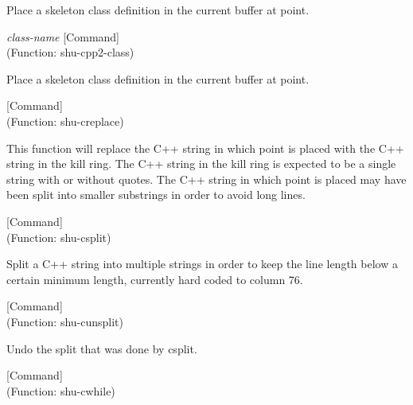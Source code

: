 \begin{doc-string}
Place a skeleton class definition in the current buffer at point.
\end{doc-string}

\vspace{1em}
\noindent
{}
\usebox{\funcname}\emph{class-name}
 \hfill [Command]\\%
 (Function: shu-cpp2-class)

\begin{doc-string}
Place a skeleton class definition in the current buffer at point.
\end{doc-string}

\vspace{1em}
\noindent
{}
\usebox{\funcname}
 \hfill [Command]\\%
 (Function: shu-creplace)

\begin{doc-string}
This function will replace the C++ string in which point is placed with the C++ string
in the kill ring.  The C++ string in the kill ring is expected to be a single string with
or without quotes.  The C++ string in which point is placed may have been split into
smaller substrings in order to avoid long lines.
\end{doc-string}

\vspace{1em}
\noindent
{}
\usebox{\funcname}
 \hfill [Command]\\%
 (Function: shu-csplit)

\begin{doc-string}
Split a C++ string into multiple strings in order to keep the line length below a
certain minimum length, currently hard coded to column 76.
\end{doc-string}

\vspace{1em}
\noindent
{}
\usebox{\funcname}
 \hfill [Command]\\%
 (Function: shu-cunsplit)

\begin{doc-string}
Undo the split that was done by csplit.
\end{doc-string}

\vspace{1em}
\noindent
{}
\usebox{\funcname}
 \hfill [Command]\\%
 (Function: shu-cwhile)

